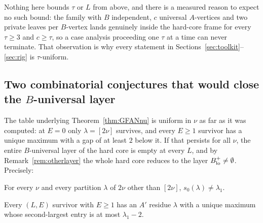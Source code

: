 Nothing here bounds $\tau$ or $L$ from above, and there is a measured reason to expect no
such bound: the family with $B$ independent, $c$ universal $A$-vertices and two private
leaves per $B$-vertex lands genuinely inside the hard-core frame for every $\tau \ge 3$ and
$c \ge \tau$, so a case analysis proceeding one $\tau$ at a time can never terminate. That
observation is why every statement in Sections~\ref{sec:toolkit}--\ref{sec:rig} is
$\tau$-uniform.

\subsection{Two combinatorial conjectures that would close the $B$-universal layer}

The table underlying Theorem~\ref{thm:GFANnu} is uniform in $\nu$ as far as it was computed:
at $E = 0$ only $\lambda = [2\nu]$ survives, and every $E \ge 1$ survivor has a unique
maximum with a gap of at least $2$ below it. If that persists for all $\nu$, the entire
$B$-universal layer of the hard core is empty at every $L$, and by
Remark~\ref{rem:otherlayer} the whole hard core reduces to the layer
$B_{\mathrm{lo}}^{+} \ne \emptyset$. Precisely:

\begin{conjecture}\label{conj:C1}
For every $\nu$ and every partition $\lambda$ of $2\nu$ other than $[2\nu]$,
$s_0(\lambda) \ne \lambda_1$.
\end{conjecture}

\begin{conjecture}\label{conj:C2}
Every $(L,E)$ survivor with $E \ge 1$ has an $A'$ residue $\lambda$ with a unique maximum
whose second-largest entry is at most $\lambda_1 - 2$.
\end{conjecture}

